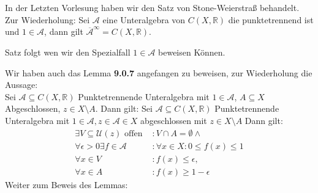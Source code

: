 \chapter{}
In der Letzten Vorlesung haben wir den Satz von Stone-Weierstraß behandelt.
Zur Wiederholung: Sei $\mathcal{A}$ eine Unteralgebra von $C(X,\mathbb{R})$ 
die punktetrennend ist und $1 \in \mathcal{A}$, dann gilt 
$\overline{\mathcal{A}}^{\infty} = C(X,\mathbb{R})$.

Satz folgt wen wir den Spezialfall $1 \in \mathcal{A}$ beweisen Können.

Wir haben auch das Lemma \textbf{9.0.7} angefangen zu beweisen, 
zur Wiederholung die Aussage: \\
Sei $\mathcal{A} \subseteq C(X,\mathbb{R})$ Punktetrennende Unteralgebra mit $1 \in \mathcal{A}$, $A \subseteq X$ Abgeschlossen, $z \in X\setminus A$. Dann gilt:
Sei $\mathcal{A}\subseteq C(X,\mathbb{R})$ Punktetrennende Unteralgebra
mit $1 \in \mathcal{A}, z \in \mathcal{A} \in X $ abgeschlossen mit $z \in X \setminus A$
Dann gilt:
\begin{equation*}
    \begin{split}
        \exists V \subseteq \mathcal{U}(z) \text{ offen } &: V \cap A = \emptyset \wedge\\
        \forall \epsilon > 0 \exists f \in \mathcal{A} &: \forall x \in X : 0 \leq f(x) \leq 1\\
        \forall x \in V &: f(x) \leq \epsilon,\\
        \forall x \in A &: f(x) \geq 1-\epsilon
    \end{split}
\end{equation*}
Weiter zum Beweis des Lemmas:
